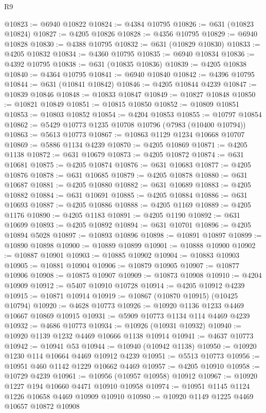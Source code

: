 \begin{lexlean}{R9}
\begin{coremodule}
@10823 := @6940 @10822
@10824 := @4384 @10795
@10826 := @631 (@10823 @10824)
@10827 := @4205 @10826
@10828 := @4356 @10795
@10829 := @6940 @10828
@10830 := @4388 @10795
@10832 := @631 (@10829 @10830)
@10833 := @4205 @10832
@10834 := @4360 @10795
@10835 := @6940 @10834
@10836 := @4392 @10795
@10838 := @631 (@10835 @10836)
@10839 := @4205 @10838
@10840 := @4364 @10795
@10841 := @6940 @10840
@10842 := @4396 @10795
@10844 := @631 (@10841 @10842)
@10846 := @4205 @10844 @4239
@10847 := @10839 @10846
@10848 := @10833 @10847
@10849 := @10827 @10848
@10850 := @10821 @10849
@10851 := @10815 @10850
@10852 := @10809 @10851
@10853 := @10803 @10852
@10854 := @4204 @10853
@10855 := @10797 @10854
@10862 := @5429 @10773 @1235 @10708 @10796 (@7983 (@10400 @10794))
@10863 := @5613 @10773
@10867 := @10863 @1129 @1234 @10668 @10707
@10869 := @5886 @1134 @4239
@10870 := @4205 @10869
@10871 := @4205 @1138
@10872 := @631 @10679
@10873 := @4205 @10872
@10874 := @631 @10681
@10875 := @4205 @10874
@10876 := @631 @10683
@10877 := @4205 @10876
@10878 := @631 @10685
@10879 := @4205 @10878
@10880 := @631 @10687
@10881 := @4205 @10880
@10882 := @631 @10689
@10883 := @4205 @10882
@10884 := @631 @10691
@10885 := @4205 @10884
@10886 := @631 @10693
@10887 := @4205 @10886
@10888 := @4205 @1169
@10889 := @4205 @1176
@10890 := @4205 @1183
@10891 := @4205 @1190
@10892 := @631 @10699
@10893 := @4205 @10892
@10894 := @631 @10701
@10896 := @4205 @10894 @5028
@10897 := @10893 @10896
@10898 := @10891 @10897
@10899 := @10890 @10898
@10900 := @10889 @10899
@10901 := @10888 @10900
@10902 := @10887 @10901
@10903 := @10885 @10902
@10904 := @10883 @10903
@10905 := @10881 @10904
@10906 := @10879 @10905
@10907 := @10877 @10906
@10908 := @10875 @10907
@10909 := @10873 @10908
@10910 := @4204 @10909
@10912 := @5407 @10910 @10728
@10914 := @4205 @10912 @4239
@10915 := @10871 @10914
@10919 := @10867 (@10870 @10915) (@10425 @10794)
@10920 := @4628 @10773
@10926 := @10920 @1136 @1233 @4469 @10667 @10869 @10915
@10931 := @5909 @10773 @1134 @114 @4469 @4239
@10932 := @4686 @10773
@10934 := @10926 (@10931 @10932)
@10940 := @10920 @1139 @1232 @4469 @10666 @1138 @10914
@10941 := @4637 @10773
@10942 := @10941 @53
@10944 := @10940 (@10942 @1138)
@10950 := @10920 @1230 @114 @10664 @4469 @10912 @4239
@10951 := @5513 @10773
@10956 := @10951 @460 @1142 @1229 @10662 @4469
@10957 := @4205 @10910
@10958 := @10729 @4239
@10961 := @10956 (@10957 @10958) @10912
@10967 := @10920 @1227 @194 @10660 @4471 @10910 @10958
@10974 := @10951 @1145 @1124 @1226 @10658 @4469 @10909 @10910
@10980 := @10920 @1149 @1225 @4469 @10657 @10872 @10908

\end{coremodule}
\end{lexlean}
